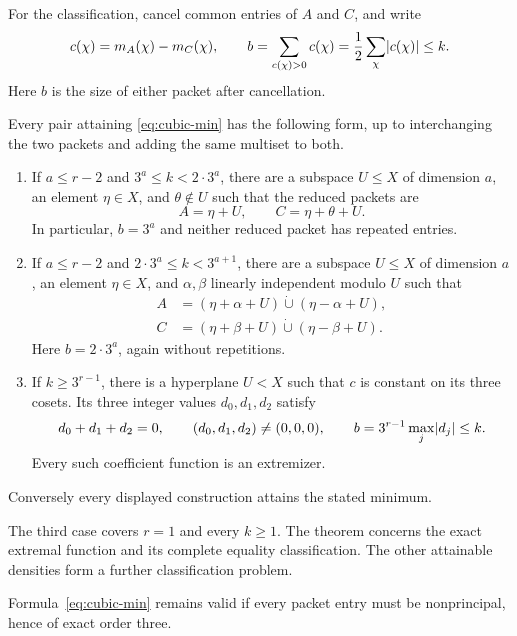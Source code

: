 For the classification, cancel common entries of $A$ and $C$, and write
\[
 c(\chi)=m_A(\chi)-m_C(\chi),\qquad
 b=\sum_{c(\chi)>0}c(\chi)=\frac12\sum_\chi\lvert c(\chi)\rvert\leq k.
\]
Here $b$ is the size of either packet after cancellation.

\begin{theorem}\label{thm:cubic-equality}
Every pair attaining \eqref{eq:cubic-min} has the following form, up to
interchanging the two packets and adding the same multiset to both.
\begin{enumerate}
\item If $a\leq r-2$ and $3^a\leq k<2\cdot3^a$, there are a subspace
  $U\leq X$ of dimension $a$, an element $\eta\in X$, and $\theta\notin U$
  such that the reduced packets are
  \[
   A=\eta+U,\qquad C=\eta+\theta+U.
  \]
  In particular, $b=3^a$ and neither reduced packet has repeated entries.
\item If $a\leq r-2$ and $2\cdot3^a\leq k<3^{a+1}$, there are a subspace
  $U\leq X$ of dimension $a$, an element $\eta\in X$, and $\alpha,\beta$
  linearly independent modulo $U$ such that
  \begin{align*}
   A&=(\eta+\alpha+U)\mathbin{\dot\cup}(\eta-\alpha+U),\\
   C&=(\eta+\beta+U)\mathbin{\dot\cup}(\eta-\beta+U).
  \end{align*}
  Here $b=2\cdot3^a$, again without repetitions.
\item If $k\geq3^{r-1}$, there is a hyperplane $U<X$ such that $c$ is
  constant on its three cosets. Its three integer values $d_0,d_1,d_2$
  satisfy
  \[
   d_0+d_1+d_2=0,\qquad(d_0,d_1,d_2)\ne(0,0,0),\qquad
   b=3^{r-1}\max_j\lvert d_j\rvert\leq k.
  \]
  Every such coefficient function is an extremizer.
\end{enumerate}
Conversely every displayed construction attains the stated minimum.
\end{theorem}

The third case covers $r=1$ and every $k\geq1$. The theorem concerns the exact
extremal function and its complete equality classification. The other
attainable densities form a further classification problem.

\begin{corollary}\label{cor:cubic-nonprincipal}
Formula~\eqref{eq:cubic-min} remains valid if every packet entry must be
nonprincipal, hence of exact order three.
\end{corollary}

